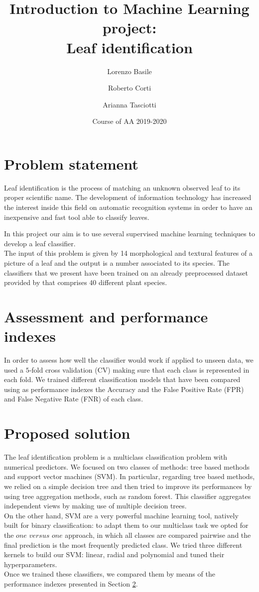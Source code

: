 \documentclass{article}
\title{Introduction to Machine Learning project:\\ Leaf identification}
\author[1]{Lorenzo Basile}
\author[2]{Roberto Corti}
\author[3]{Arianna Tasciotti}
\affil[1,2,3]{
    problem statement,
    solution design,
    solution development,
    writing
}
\date{Course of AA 2019-2020}
\begin{document}
\maketitle



\section{Problem statement}
Leaf identification is the process of matching an unknown observed leaf to its proper scientific name. The development of information technology has increased the interest inside this field on automatic recognition systems in order to have an inexpensive and fast tool able to classify leaves.  

In this project our aim is to use several supervised machine learning techniques to develop a leaf classifier. \\
The input of this problem is given by 14 morphological and textural features of a picture of a leaf and the output is a number associated to its species. The classifiers that we present have been trained on an already preprocessed dataset provided by \cite{silva} that comprises 40 different plant species.

\section{Assessment and performance indexes}\label{2}
In order to assess how well the classifier would work if applied to unseen data, we used a $5$-fold cross validation (CV) making sure that each class is represented in each fold. We trained different classification models that have been compared using as performance indexes the Accuracy and the False Positive Rate (FPR) and False Negative Rate (FNR) of each class.

\section{Proposed solution}
The leaf identification problem is a multiclass classification problem with numerical predictors. We focused on two classes of methods: tree based methods and support vector machines (SVM).
In particular, regarding tree based methods, we relied on a simple decision tree and then tried to improve its performances by using tree aggregation methods, such as random forest. This classifier aggregates independent views by making use of multiple decision trees. 
\\On the other hand, SVM are a very powerful machine learning tool, natively built for binary classification: to adapt them to our multiclass task we opted for the $\textit{one versus one}$ approach, in which all classes are compared pairwise and the final prediction is the most frequently predicted class. We tried three different kernels to build our SVM: linear, radial and polynomial and tuned their hyperparameters.
\\Once we trained these classifiers, we compared them by means of the performance indexes presented in Section \ref{2}.
\end{document}
